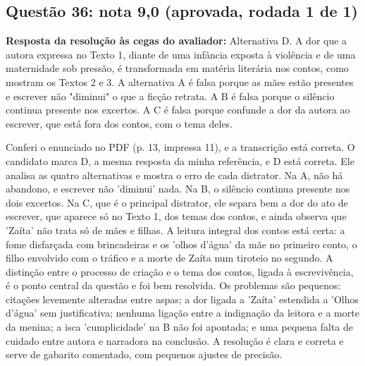 \documentclass{article}%
\begin{document}
\subsection*{Questão 36: nota 9,0 (aprovada, rodada 1 de 1)}%
\textbf{Resposta da resolução às cegas do avaliador:} Alternativa D. A dor que a autora expressa no Texto 1, diante de uma infância exposta à violência e de uma maternidade sob pressão, é transformada em matéria literária nos contos, como mostram os Textos 2 e 3. A alternativa A é falsa porque as mães estão presentes e escrever não "diminui" o que a ficção retrata. A B é falsa porque o silêncio continua presente nos excertos. A C é falsa porque confunde a dor da autora ao escrever, que está fora dos contos, com o tema deles.\par %
Conferi o enunciado no PDF (p. 13, impressa 11), e a transcrição está correta. O candidato marca D, a mesma resposta da minha referência, e D está correta. Ele analisa as quatro alternativas e mostra o erro de cada distrator. Na A, não há abandono, e escrever não 'diminui' nada. Na B, o silêncio continua presente nos dois excertos. Na C, que é o principal distrator, ele separa bem a dor do ato de escrever, que aparece só no Texto 1, dos temas dos contos, e ainda observa que 'Zaíta' não trata só de mães e filhas. A leitura integral dos contos está certa: a fome disfarçada com brincadeiras e os 'olhos d'água' da mãe no primeiro conto, o filho envolvido com o tráfico e a morte de Zaíta num tiroteio no segundo. A distinção entre o processo de criação e o tema dos contos, ligada à escrevivência, é o ponto central da questão e foi bem resolvida. Os problemas são pequenos: citações levemente alteradas entre aspas; a dor ligada a 'Zaíta' estendida a 'Olhos d'água' sem justificativa; nenhuma ligação entre a indignação da leitora e a morte da menina; a isca 'cumplicidade' na B não foi apontada; e uma pequena falta de cuidado entre autora e narradora na conclusão. A resolução é clara e correta e serve de gabarito comentado, com pequenos ajustes de precisão.%
\end{document}
